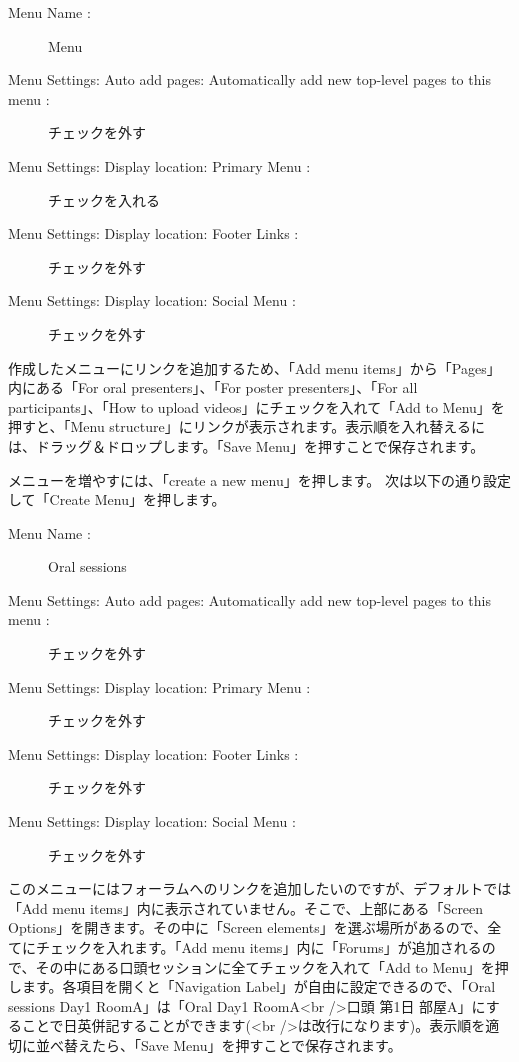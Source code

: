 \documentclass[titlepage,10pt,a4paper,uplatex]{jsbook}
\begin{document}
\begin{description}
\item[Menu Name : ] Menu
\item[Menu Settings: Auto add pages: Automatically add new top-level pages to this menu : ] チェックを外す
\item[Menu Settings: Display location: Primary Menu : ] チェックを入れる
\item[Menu Settings: Display location: Footer Links : ] チェックを外す
\item[Menu Settings: Display location: Social Menu : ] チェックを外す
\end{description}

作成したメニューにリンクを追加するため、「Add menu items」から「Pages」内にある「For oral presenters」、「For poster presenters」、「For all participants」、「How to upload videos」にチェックを入れて「Add to Menu」を押すと、「Menu structure」にリンクが表示されます。表示順を入れ替えるには、ドラッグ＆ドロップします。「Save Menu」を押すことで保存されます。

メニューを増やすには、「create a new menu」を押します。
次は以下の通り設定して「Create Menu」を押します。

\begin{description}
\item[Menu Name : ] Oral sessions
\item[Menu Settings: Auto add pages: Automatically add new top-level pages to this menu : ] チェックを外す
\item[Menu Settings: Display location: Primary Menu : ] チェックを外す
\item[Menu Settings: Display location: Footer Links : ] チェックを外す
\item[Menu Settings: Display location: Social Menu : ] チェックを外す
\end{description}

このメニューにはフォーラムへのリンクを追加したいのですが、デフォルトでは「Add menu items」内に表示されていません。そこで、上部にある「Screen Options」を開きます。その中に「Screen elements」を選ぶ場所があるので、全てにチェックを入れます。「Add menu items」内に「Forums」が追加されるので、その中にある口頭セッションに全てチェックを入れて「Add to Menu」を押します。各項目を開くと「Navigation Label」が自由に設定できるので、「Oral sessions Day1 RoomA」は「Oral Day1 RoomA{\textless}br /{\textgreater}口頭 第1日 部屋A」にすることで日英併記することができます({\textless}br /{\textgreater}は改行になります)。表示順を適切に並べ替えたら、「Save Menu」を押すことで保存されます。
\end{document}
